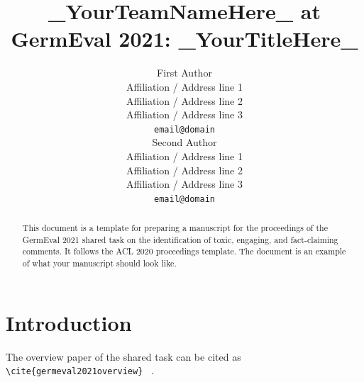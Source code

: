 \documentclass[11pt,a4paper]{article}
\title{\_YourTeamNameHere\_ at GermEval 2021: \_YourTitleHere\_ }
\author{First Author \\
  Affiliation / Address line 1 \\
  Affiliation / Address line 2 \\
  Affiliation / Address line 3 \\
  \texttt{email@domain} \\\And
  Second Author \\
  Affiliation / Address line 1 \\
  Affiliation / Address line 2 \\
  Affiliation / Address line 3 \\
  \texttt{email@domain} \\}
\date{}
\begin{document}
\maketitle
\begin{abstract}
This document is a template for preparing a manuscript for the proceedings of the GermEval 2021 shared task on the identification of toxic, engaging, and fact-claiming comments. It follows the ACL 2020 proceedings template.
The document is an example of what your manuscript should look like.
\end{abstract}

\section{Introduction}
The overview paper of the shared task can be cited as \small\verb|\cite{germeval2021overview}| ~\cite{germeval2021overview}.



\end{document}
